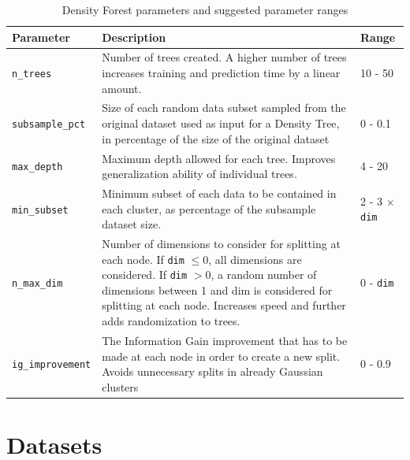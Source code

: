 \documentclass[10pt]{article}
\begin{document}
\begin{table}[H]
    \centering
    \begin{tabular}{p{3cm}p{9cm}p{2.5cm}}
    \toprule
    Parameter & Description & Range \\ \midrule
    \texttt{n\_trees} & Number of trees created. A higher number of trees increases training and prediction time by a linear amount. & 10 - 50 \\
    \texttt{subsample\_pct} & Size of each random data subset sampled from the original dataset used as input for a Density Tree, in percentage of the size of the original dataset & 0 - 0.1 \\
    \texttt{max\_depth} & Maximum depth allowed for each tree. Improves generalization ability of individual trees. & 4 - 20 \\
    \texttt{min\_subset} & Minimum subset of each data to be contained in each cluster, as percentage of the subsample dataset size. & 2 - 3 $\times$ \texttt{dim} \\
    \texttt{n\_max\_dim} & Number of dimensions to consider for splitting at each node. If \texttt{dim} $\leq 0$, all dimensions are considered. If \texttt{dim} $> 0$, a random number of dimensions between 1 and dim is considered for splitting at each node. Increases speed and further adds randomization to trees. & 0 - \texttt{dim} \\
    \texttt{ig\_improvement} & The Information Gain improvement that has to be made at each node in order to create a new split. Avoids unnecessary splits in already Gaussian clusters & 0 - 0.9\\\bottomrule
    \end{tabular}
    \caption{Density Forest parameters and suggested parameter ranges}
    \label{table:df-parameters}
\end{table}


\section{Datasets}
\end{document}
